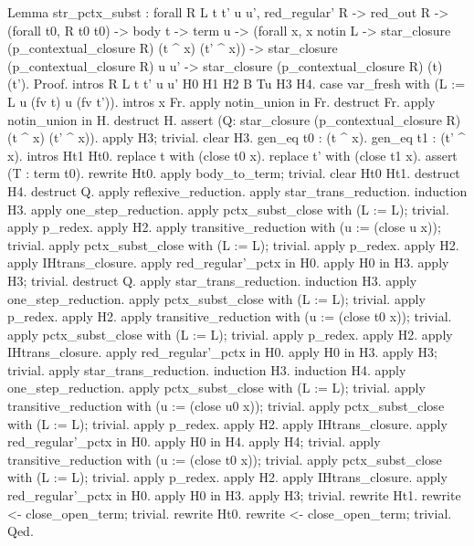 \documentclass[12pt]{report}
\begin{document}
Lemma str\_pctx\_subst : forall R L t t' u u', red\_regular' R -> red\_out R -> (forall t0, R t0 t0) -> 
                        body t -> term u ->
                       (forall x, x notin L ->  star\_closure (p\_contextual\_closure R) (t \^{} x) (t' \^{} x)) -> 
                       star\_closure (p\_contextual\_closure R) u u' ->
                       star\_closure (p\_contextual\_closure R) (t) (t').
Proof.
 intros R L t t' u u' H0 H1 H2 B Tu H3 H4.  case var\_fresh with (L := L u (fv t) u (fv t')). intros x Fr.
 apply notin\_union in Fr. destruct Fr. apply notin\_union in H. destruct H.
 assert (Q: star\_closure (p\_contextual\_closure R) (t \^{} x) (t' \^{} x)). apply H3; trivial. clear H3.
 gen\_eq t0 : (t \^{} x). gen\_eq t1 : (t' \^{} x). intros Ht1 Ht0.
 replace t with (close t0 x). replace t' with (close t1 x).
 assert (T : term t0). rewrite Ht0. apply body\_to\_term; trivial.
 clear Ht0 Ht1. destruct H4. destruct Q. apply reflexive\_reduction.
 apply star\_trans\_reduction. induction H3.
 apply one\_step\_reduction. apply pctx\_subst\_close with (L := L); trivial. apply p\_redex. apply H2.
 apply transitive\_reduction with (u := (close u x)); trivial.
 apply pctx\_subst\_close with (L := L); trivial. apply p\_redex. apply H2. 
 apply IHtrans\_closure. apply red\_regular'\_pctx in H0. apply H0 in H3. apply H3; trivial.
 destruct Q. apply star\_trans\_reduction. induction H3. apply one\_step\_reduction.
 apply pctx\_subst\_close with (L := L); trivial. apply p\_redex. apply H2.
 apply transitive\_reduction with (u := (close t0 x)); trivial.
 apply pctx\_subst\_close with (L := L); trivial. apply p\_redex. apply H2. 
 apply IHtrans\_closure. apply red\_regular'\_pctx in H0. apply H0 in H3. apply H3; trivial.
 apply star\_trans\_reduction. induction H3. induction H4.
 apply one\_step\_reduction. apply pctx\_subst\_close with (L := L); trivial.
 apply transitive\_reduction with (u := (close u0 x)); trivial.
 apply pctx\_subst\_close with (L := L); trivial. apply p\_redex. apply H2. 
 apply IHtrans\_closure. apply red\_regular'\_pctx in H0. apply H0 in H4. apply H4; trivial.
 apply transitive\_reduction with (u := (close t0 x)); trivial.
 apply pctx\_subst\_close with (L := L); trivial. apply p\_redex. apply H2. 
 apply IHtrans\_closure. apply red\_regular'\_pctx in H0. apply H0 in H3. apply H3; trivial.
 rewrite Ht1. rewrite <- close\_open\_term; trivial. 
 rewrite Ht0. rewrite <- close\_open\_term; trivial.
Qed.
\begin{coqdoccode}
\end{coqdoccode}
\end{document}

